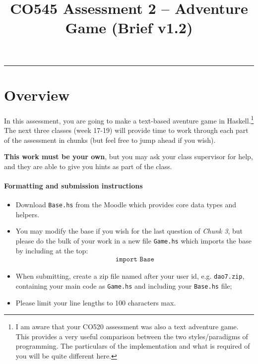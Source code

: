 \documentclass{article}
\date{}
\title{\vspace{-5em}CO545 Assessment 2 -- Adventure Game
{\footnotesize{(Brief v1.2)}}}
\begin{document}
\maketitle
\vspace{-5em}
\hrule
\vspace{1em}

\section{Overview}

In this assessment, you are going to make a text-based aventure game
in Haskell.\footnote{I am aware that your CO520 assessment was also a
  text adventure game. This provides a very useful comparison between
  the two styles/paradigms of programming. The particulars of the
  implementation and what is required of you will be quite different
  here. } The next three classes (week 17-19) will provide time
to work through each part of the assessment in chunks (but feel free
to jump ahead if you wish).

\textbf{This work must be your own}, but you may ask your class supervisor
for help, and they are able to give you hints as part of the class.

\paragraph{Formatting and submission instructions}
%
\begin{itemize}[itemsep=0.1em]
\item Download \texttt{Base.hs} from the Moodle which provides core
  data types and helpers.

\item You may modify the base if you wish for the last question of
  \textit{Chunk 3}, but please do the bulk of your work in a new file
  \texttt{Game.hs} which imports the base by including at the top:
%
\begin{align*}
\texttt{import Base}
\end{align*}
%

\item When submitting, create a zip file named after your user id,
  e.g. \texttt{dao7.zip}, containing your main code as
  \texttt{Game.hs} and including your \texttt{Base.hs} file;

\item Please limit your line lengths to 100 characters max.
\end{itemize}
%
\end{document}
